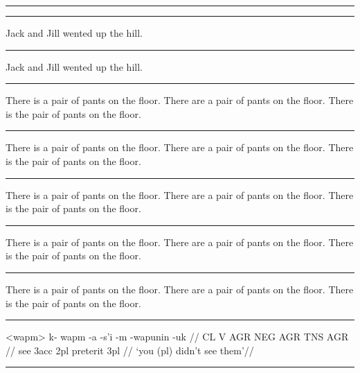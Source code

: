 \documentclass[12pt]{article}
\begin{document}
\filbreak\hrule\medskip

\begingroup
{}
\endgroup
\bigskip

\filbreak\hrule\medskip

\begingroup
\ex *Jack and Jill wented up the hill.\xe
\endgroup
\bigskip

\filbreak\hrule\medskip

\begingroup
\ex \judge* Jack and Jill wented up the hill.\xe
\endgroup
\bigskip

\filbreak\hrule\medskip

\begingroup
\pex
\a There is a pair of pants on the floor.
\a {}There are a pair of pants on the floor.
\a \judge*There is the pair of pants on the floor.
\xe
\endgroup
\bigskip

\filbreak\hrule\medskip

\begingroup
\pex
\a There is a pair of pants on the floor.
\a {}There are a pair of pants on the floor.
\a \ljudge*There is the pair of pants on the floor.
\xe
\endgroup
\bigskip

\filbreak\hrule\medskip

\begingroup
\pex[*=?*]
\a There is a pair of pants on the floor.
\a {}There are a pair of pants on the floor.
\a \ljudge*There is the pair of pants on the floor.
\xe
\endgroup
\bigskip

\filbreak\hrule\medskip

\begingroup
\pex[*]
\a There is a pair of pants on the floor.
\a \ljudge* There are a pair of pants on the floor.
\a \ljudge* There is the pair of pants on the floor.
\xe
\endgroup
\bigskip

\filbreak\hrule\medskip

\begingroup
\pex[*=?*,textoffset=!-.3em]
\a There is a pair of pants on the floor.
\a {} There are a pair of pants on the floor.
\a \ljudge* There is the pair of pants on the floor.
\xe
\endgroup
\bigskip

\filbreak\hrule\medskip

\begingroup
 \ex<wapm>
\begingl
\gla k- wapm -a -s'i -m -wapunin -uk //
\glb CL V AGR NEG AGR TNS AGR //
 see {\sc 3acc} {} {\sc 2pl} preterit {\sc 3pl} //
\glft `you (pl) didn't see them'//
\endgl
\xe
\endgroup
\bigskip

\filbreak\hrule\medskip
\end{document}
